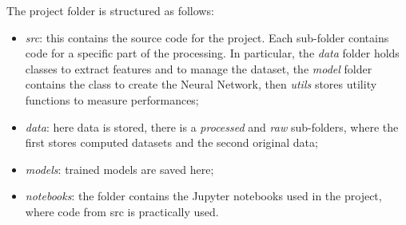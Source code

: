 The project folder is structured as follows:
\begin{itemize}
    \item \emph{src}: this contains the source code for the
    project. Each sub-folder contains code for a specific part of the 
    processing. In particular, the \emph{data} folder holds classes to 
    extract features and to manage the dataset, the \emph{model} folder
    contains the class to create the Neural Network, then \emph{utils} 
    stores utility functions to measure performances;
    \item \emph{data}: here data is stored, there is a \emph{processed}
    and \emph{raw} sub-folders, where the first stores computed datasets 
    and the second original data;
    \item \emph{models}: trained models are saved here;
    \item \emph{notebooks}: the folder contains the Jupyter notebooks 
    used in the project, where code from src is practically used.
\end{itemize}
\newpage